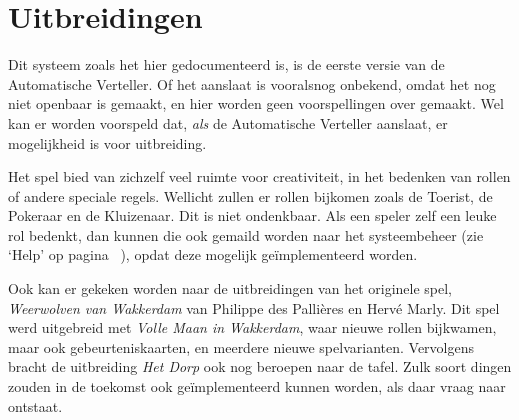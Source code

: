 \documentclass[12pt]{article}
\begin{document}
\section{Uitbreidingen}

  Dit systeem zoals het hier gedocumenteerd is, is de eerste versie van de Automatische Verteller. Of het aanslaat is vooralsnog onbekend, omdat het nog niet openbaar is gemaakt, en hier worden geen voorspellingen over gemaakt. Wel kan er worden voorspeld dat, \emph{als} de Automatische Verteller aanslaat, er mogelijkheid is voor uitbreiding. 
  
  Het spel bied van zichzelf veel ruimte voor creativiteit, in het bedenken van rollen of andere speciale regels. Wellicht zullen er rollen bijkomen zoals de Toerist, de Pokeraar en de Kluizenaar. Dit is niet ondenkbaar. Als een speler zelf een leuke rol bedenkt, dan kunnen die ook gemaild worden naar het systeembeheer (zie `Help' op pagina~\pageref{subsec:help} ), opdat deze mogelijk ge\"implementeerd worden.
  
  Ook kan er gekeken worden naar de uitbreidingen van het originele spel, \emph{Weerwolven van Wakkerdam} van Philippe des Palli\`eres en Herv\'e Marly. Dit spel werd uitgebreid met \emph{Volle Maan in Wakkerdam}, waar nieuwe rollen bijkwamen, maar ook gebeurteniskaarten, en meerdere nieuwe spelvarianten. Vervolgens bracht de uitbreiding \emph{Het Dorp} ook nog beroepen naar de tafel. Zulk soort dingen zouden in de toekomst ook ge\"implementeerd kunnen worden, als daar vraag naar ontstaat.
\end{document}
